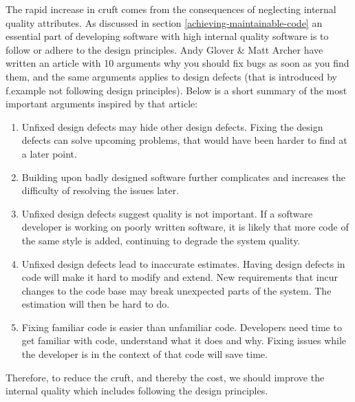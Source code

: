 \documentclass{report}
\begin{document}
The rapid increase in cruft comes from the consequences of neglecting internal quality attributes. As discussed in section \ref{achieving-maintainable-code} an essential part of developing software with high internal quality software is to follow or adhere to the design principles. Andy Glover \& Matt Archer have written an article with 10 arguments why you should fix bugs as soon as you find them\cite{10reasons}, and the same arguments applies to design defects (that is introduced by f.example not following design principles). Below is a short summary of the most important arguments inspired by that article:

\begin{enumerate}
    \item Unfixed design defects may hide other design defects. Fixing the design defects can solve upcoming problems, that would have been harder to find at a later point.
    \item Building upon badly designed software further complicates and increases the difficulty of resolving the issues later.
  
    \item Unfixed design defects suggest quality is not important. If a software developer is working on poorly written software, it is likely that more code of the same style is added, continuing to degrade the system quality.
   
    \item Unfixed design defects lead to inaccurate estimates. Having design defects in code will make it hard to modify and extend. New requirements that incur changes to the code base may break unexpected parts of the system. The estimation will then be hard to do.
   
    \item Fixing familiar code is easier than unfamiliar code. Developers need time to get familiar with code, understand what it does and why. Fixing issues while the developer is in the context of that code will save time.
\end{enumerate}

Therefore, to reduce the cruft, and thereby the cost, we should improve the internal quality which includes following the design principles.


\end{document}

